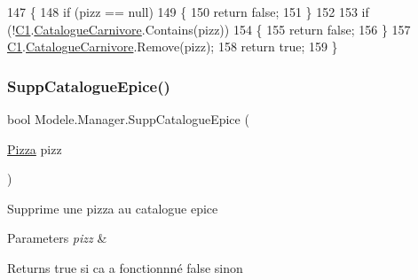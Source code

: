 \begin{DoxyCode}
147         \{
148             \textcolor{keywordflow}{if} (pizz == null)
149             \{
150                 \textcolor{keywordflow}{return} \textcolor{keyword}{false};
151             \}
152 
153             \textcolor{keywordflow}{if} (!\hyperlink{classModele_1_1Manager_a54bbc7bd646fcaa0f1a590310dd3c02c}{C1}.\hyperlink{classModele_1_1Catalogue_a4af9ef768f67cef6dfe545e22a6d63af}{CatalogueCarnivore}.Contains(pizz))
154             \{
155                 \textcolor{keywordflow}{return} \textcolor{keyword}{false};
156             \}
157             \hyperlink{classModele_1_1Manager_a54bbc7bd646fcaa0f1a590310dd3c02c}{C1}.\hyperlink{classModele_1_1Catalogue_a4af9ef768f67cef6dfe545e22a6d63af}{CatalogueCarnivore}.Remove(pizz);
158             \textcolor{keywordflow}{return} \textcolor{keyword}{true};
159         \}
\end{DoxyCode}
\mbox{\label{classModele_1_1Manager_a88f23540b7d8952994f3bbdf9e7d9e51}} 
\subsubsection{\texorpdfstring{Supp\+Catalogue\+Epice()}{SuppCatalogueEpice()}}
{\footnotesize\ttfamily bool Modele.\+Manager.\+Supp\+Catalogue\+Epice (\begin{DoxyParamCaption}\item[{\hyperlink{classModele_1_1Pizza}{Pizza}}]{pizz }\end{DoxyParamCaption})\hspace{0.3cm}{\ttfamily [inline]}}



Supprime une pizza au catalogue epice 


\begin{DoxyParams}{Parameters}
{\em pizz} & \\
\hline
\end{DoxyParams}
\begin{DoxyReturn}{Returns}
true si ca a fonctionnné false sinon
\end{DoxyReturn}

